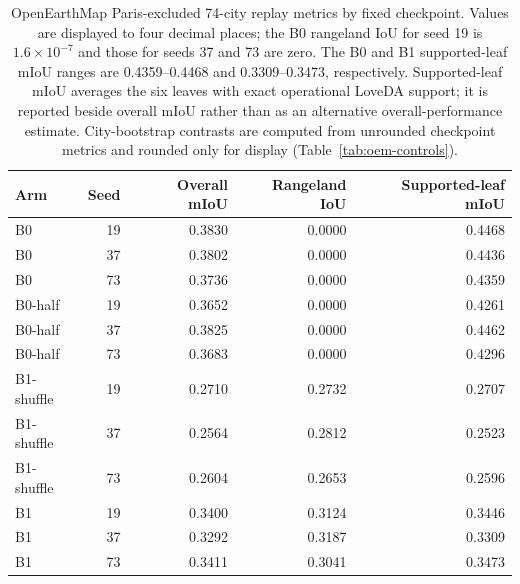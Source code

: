 \begin{table}[H]
\centering
\caption{OpenEarthMap Paris-excluded 74-city replay metrics by fixed checkpoint. Values are displayed to four decimal places; the B0 rangeland IoU for seed 19 is $1.6\times10^{-7}$ and those for seeds 37 and 73 are zero. The B0 and B1 supported-leaf mIoU ranges are 0.4359--0.4468 and 0.3309--0.3473, respectively. Supported-leaf mIoU averages the six leaves with exact operational LoveDA support; it is reported beside overall mIoU rather than as an alternative overall-performance estimate. City-bootstrap contrasts are computed from unrounded checkpoint metrics and rounded only for display (Table~\ref{tab:oem-controls}).}
\label{tab:oem-seeds}
\small
\renewcommand{\arraystretch}{1.12}
\setlength{\tabcolsep}{4pt}
\begin{tabular*}{\linewidth}{@{\extracolsep{\fill}}lrrrr@{}}
\toprule
Arm & Seed & Overall mIoU & Rangeland IoU & Supported-leaf mIoU \\
\midrule
B0 & 19 & 0.3830 & 0.0000 & 0.4468 \\
B0 & 37 & 0.3802 & 0.0000 & 0.4436 \\
B0 & 73 & 0.3736 & 0.0000 & 0.4359 \\
B0-half & 19 & 0.3652 & 0.0000 & 0.4261 \\
B0-half & 37 & 0.3825 & 0.0000 & 0.4462 \\
B0-half & 73 & 0.3683 & 0.0000 & 0.4296 \\
B1-shuffle & 19 & 0.2710 & 0.2732 & 0.2707 \\
B1-shuffle & 37 & 0.2564 & 0.2812 & 0.2523 \\
B1-shuffle & 73 & 0.2604 & 0.2653 & 0.2596 \\
B1 & 19 & 0.3400 & 0.3124 & 0.3446 \\
B1 & 37 & 0.3292 & 0.3187 & 0.3309 \\
B1 & 73 & 0.3411 & 0.3041 & 0.3473 \\
\bottomrule
\end{tabular*}
\end{table}
